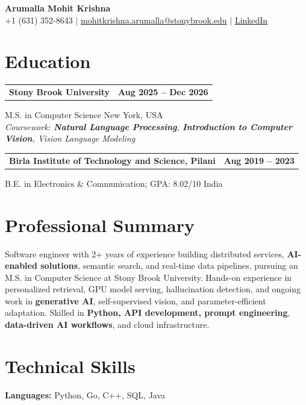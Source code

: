 \documentclass[letterpaper,10pt]{article}
\makeatletter
\newcommand{\entry}[2]{%
  \noindent
  \begin{tabularx}{\linewidth}
    {@{}>{\raggedright\arraybackslash}X@{\hspace{6pt}}r@{}}
    \textbf{#1} & #2
  \end{tabularx}\par
}
\makeatother
\begin{document}
\begin{center}
    {\LARGE\bfseries Arumalla Mohit Krishna}\\[3pt]
    +1 (631) 352-8643 $|$
    \href{mailto:mohitkrishna.arumalla@stonybrook.edu}
    {mohitkrishna.arumalla@stonybrook.edu} $|$
    \href{https://linkedin.com/in/mohit-krishna-arumalla}
    {LinkedIn}
\end{center}
\vspace{-8pt}

\section{Education}

\entry
  {\textbf{Stony Brook University}}
  {\textbf{Aug 2025 -- Dec 2026}}

M.S. in Computer Science \hfill New York, USA\\
\textit{
Coursework: \textbf{Natural Language Processing},
\textbf{Introduction to Computer Vision}, Vision Language Modeling
}
\vspace{3pt}

\entry
  {\textbf{Birla Institute of Technology and Science, Pilani}}
  {\textbf{Aug 2019 -- 2023}}

B.E. in Electronics \& Communication; GPA: 8.02/10 \hfill India
\section{Professional Summary}

Software engineer with 2+ years of experience building distributed services,
\textbf{AI-enabled solutions}, semantic search, and real-time data pipelines,
pursuing an M.S. in Computer Science at Stony Brook University. Hands-on experience
in personalized retrieval, GPU model serving, hallucination detection, and ongoing
work in \textbf{generative AI}, self-supervised vision, and parameter-efficient adaptation.
Skilled in \textbf{Python, API development, prompt engineering},
\textbf{data-driven AI workflows}, and cloud infrastructure.
\section{Technical Skills}

\textbf{Languages:}
Python, Go, C++, SQL, Java\\
\end{document}
